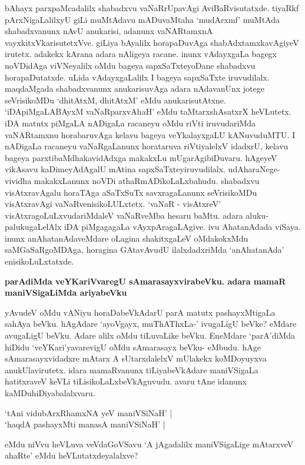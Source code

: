 \noindent
bAhayx parxpaMcadalilx shabadxvu vaNaRrUpavAgi AviBaRvisutatxde. tiyaRkf pArxNi\-gaLalilxyU giLi muMtAdavu mADuvaMtaha `mudArxmf' muMtAda shabadxvanunx nAvU anukarisi, adanunx vaNAR\-tamxnA vayxkitxVkarisutetxVve. giLiya bAyalilx horapaDuvAga shabAdxtamxkavAgiyeV irutetx. adakekx kArana adara nAligeya racane. inunx vAdayxgaLa bagegx noVDidAga viVNeyalilx oMdu bageya sapxSaTxteyoDane shabadxvu horapaDutatxde. uLida vAdayxgaLalilx I bageya sapxSaTxte iruvudilalx. maqdaMgada shabadxvanunx anukarisu\-vAga adara nAdavanUnx jotege seVrisikoMDu `dhitAtxM, dhitAtxM' eMdu anukarisutAtxne. `iDApiMga\-LABAyxM vaNaRparxvAhaH'\label{204} eMdu taMtarxshAsatxrX heVLutetx. iDA matutx piMgaLA nADigaLa racaneyu oMdu riVti iruvudariMda vaNARtamxnu horabaruvAga kelavu bageya veYkalayxgaLU kANuvuduMTU. I nADigaLa racaneyu vaNaRgaLanunx horataruva riVtiyalelxV idadxrU, kelavu bageya parxtibaMdhakavidAdxga makakxLu mUgarAgibiDuvaru. hAgeyeV vikAsavu kaDimeyAdAgalU mAtina sapxSaTxteyiruvudilalx. udAhara\-Nege- vividha makakxLanunx noVDi athaRmADikoLaLxbahudu. shabadxvu visAtxravAgalu horaTAga aSaTxSuTx\- savxragaLanunx seVrisikoMDu visAtxravAgi vaNaRvenisikoLULxtetx. `vaNaR - visAtxreV' visAtxragoLuLxvudariM\-daleV vaNaRveMba hesaru baMtu. adara aluku-palukugaLelAlx iDA piMgagagaLa vAyxpAragaLAgive. ivu AhatanAdada viSaya. inunx anAhatanAdaveMdare oLagina shakitxgaLeV oMdakokxMdu saMGaSaRgoMDAga, horagina GAtavAvudU ilalxdadxriMda `anAhatanAda' enisikoLuLxtatxde.

{\bigskip
\noindent
{\large\bf parAdiMda veYKariVvaregU sAmarasayxvirabeVku. adara mamaR maniVSigaLiMda ariyabeVku}}\label{page204}
\medskip

\noindent
yAvudeV oMdu vANiyu horaDabeVkAdarU parA matutx pashayxMtigaLa sahAya beVku. hAgA\-dare `ayoVgayx, muThAThxLa-' ivugaLigU beVke? eMdare avugaLigU beVku. Adare alilx oMdu tiLu\-vaLike beVku. EneMdare `parA'diMda hiDidu `veYKari'yavarevigU oMdu sAmarasayx beVku- eMbudu. hAge sAmarasayxvidadxre mAtarx A sUtarxdalelxV mUlakekx koMDoyuyxva anukUlavirutetx. idara mamaR\-vanunx tiLiyabeVkAdare maniVSigaLa hatitxraveV keVLi tiLisikoLaLxbeVkAguvudu. avaru tAne idanunx kaMDu\-hiDiyabalalxvaru.

\begin{shloka}
`tAni vidubArxRhamxNA yeV maniVSiNaH' |\\\label{205}
`haqdA pashayxMti manasA maniVSiNaH' |\label{205}
\end{shloka}

\noindent
eMdu niVvu heVLuva veVdaGoVSavu `A jAgadalilx maniVSigaLige mAtarxveV ahaRte' eMdu heVLu\-tatxdeyalalxve?


